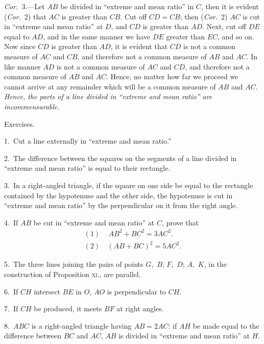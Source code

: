 \documentclass[oneside]{book}
\newcommand\exhead[1]{
\Needspace*{5\baselineskip}\begin{center}
\textsf{#1}
\end{center}
}
\begin{document}
\emph{Cor.}\ 3.---Let $AB$ be divided in ``extreme and mean
ratio'' in $C$, then it is evident
(\emph{Cor.}\ 2) that $AC$ is greater
than $CB$. Cut off $CD = CB$;
then (\emph{Cor.}\ 2) $AC$ is cut in ``extreme and mean ratio'' at
$D$, and $CD$ is greater than $AD$. Next, cut off $DE$ equal
to $AD$, and in the same manner we have $DE$ greater
than $EC$, and so on. Now since $CD$ is greater than $AD$,
it is evident that $CD$ is not a common measure of $AC$
and $CB$, and therefore not a common measure of $AB$
and $AC$. In like manner $AD$ is not a common measure
of $AC$ and $CD$, and therefore not a common measure of
$AB$ and $AC$. Hence, no matter how far we proceed
we cannot arrive at any remainder which will be a
common measure of $AB$ and $AC$. \textit{Hence, the parts of a
line divided in ``extreme and mean ratio''
are incommensurable.}

\exhead{Exercises.}

\begin{footnotesize}
1.~Cut a line externally in ``extreme and mean ratio.''

2.~The difference between the squares on the segments of a
line divided in ``extreme and mean ratio'' is equal to their
rectangle.

3.~In a right-angled triangle, if the square on one side be equal
to the rectangle contained by the hypotenuse and the other side,
the hypotenuse is cut in ``extreme and mean ratio'' by the
perpendicular on it from the right angle.

4.~If $AB$ be cut in ``extreme and mean ratio'' at $C$, prove
that
\begin{align*}
  (1) &\,\ AB^2 + BC^2 = 3AC^2.  \\
  (2) &\  (AB + BC)^2 = 5AC^2.
\end{align*}

5.~The three lines joining the pairs of points $G$,~$B$; $F$,~$D$;
$A$,~$K$, in the construction of Proposition \textsc{xi}., are parallel.

6.~If $CH$ intersect $BE$ in $O$, $AO$ is perpendicular to $CH$.

7.~If $CH$ be produced, it meets $BF$ at right angles.

8.~$ABC$ is a right-angled triangle having $AB = 2AC$: if $AH$
be made equal to the difference between $BC$ and $AC$, $AB$ is
divided in ``extreme and mean ratio'' at $H$.
\par\end{footnotesize}
\end{document}
